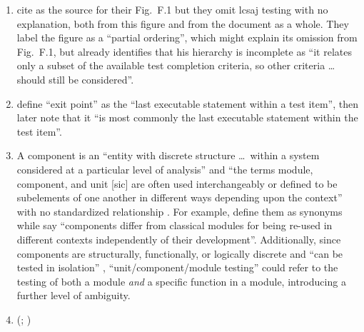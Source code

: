 \begin{enumerate}
    \item %
          \citet{IEEE2021c} cite \citet{Reid1996} as the source for their
          Fig.~F.1 but they omit \acf{lcsaj} testing with no explanation, both
          from this figure and from the document as a whole. They label the
          figure as a ``partial ordering'', which might explain its omission
          from Fig.~F.1, but \citet[p.~7]{Reid1996} already identifies that his
          hierarchy is incomplete as ``it relates only a subset of the
          available test completion criteria, so other criteria \dots{} should
          still be considered''.
    \item %
          \citet[p.~4]{IEEE2021c} define ``exit point'' as the ``last executable
          statement within a test item'', then later note that it ``is most
          commonly the last executable statement within the test item''.
    \item %
          A component is an ``entity with discrete structure \dots\ within a
          system considered at a particular level of analysis''
          \citep{ISO_IEC2023b} and ``the terms module, component, and unit
              [sic] are often used interchangeably or defined to be subelements
          of one another in different ways depending upon the context'' with
          no standardized relationship \citep[p.~82]{IEEE2017}. For example,
          \citetISTQB{} define them as synonyms while
          \citet[p.~107]{BaresiAndPezzè2006} say ``components
          differ from classical modules for being re-used in different contexts
          independently of their development''.
          Additionally, since components are structurally, functionally, or
          logically discrete \citep[p.~419]{IEEE2017} and ``can be tested in
          isolation'' \citepISTQB{}, ``unit/component/module testing'' could
          refer to the testing of both a module \emph{and} a specific function
          in a module, introducing a further level of
          ambiguity.
    \item %
          \citeauthor{IEEE2017} \ifnotpaper
              (\citeyear[pp.~469, 470]{IEEE2017}; \citeyear[p.~9]{IEEE2013}) \else

\end{enumerate}
